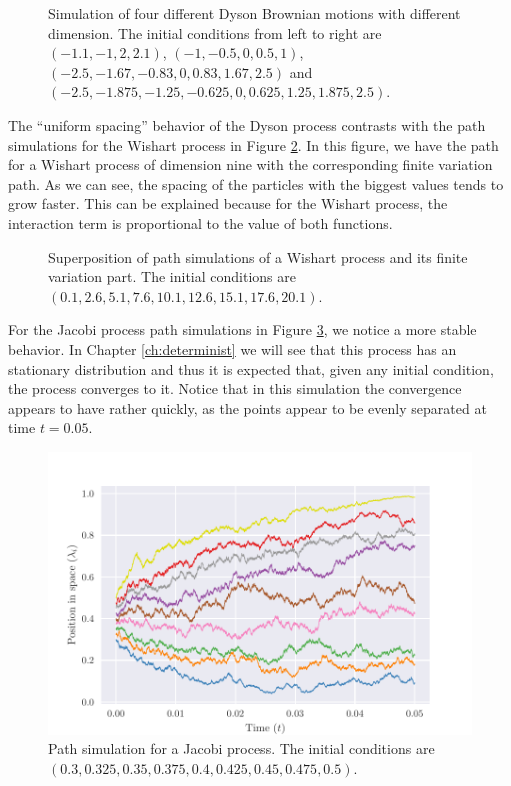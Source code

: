 \begin{figure}[h!] 
    
    \caption{Simulation of four different Dyson Brownian motions with different dimension. The initial conditions from left to right are $(-1.1,-1,2,2.1)$, $(-1, -0.5, 0, 0.5, 1)$, $(-2.5,-1.67,-0.83,0,0.83,1.67,2.5)$ and $(-2.5,-1.875,-1.25,-0.625,0,0.625,1.25,1.875,2.5)$.\label{fig:four_dyson}}
\end{figure}

The ``uniform spacing'' behavior of the Dyson process contrasts with the path simulations for the Wishart process in Figure \ref{fig:wishart_comparison}. In this figure, we have the path for a Wishart process of dimension nine with the corresponding finite variation path. As we can see, the spacing of the particles with the biggest values tends to grow faster. This can be explained because for the Wishart process, the interaction term is proportional to the value of both functions.

\begin{figure} 
    
    \caption{Superposition of path simulations of a Wishart process and its finite variation part. The initial conditions are $(0.1,2.6,5.1,7.6,10.1,12.6,15.1,17.6,20.1)$.\label{fig:wishart_comparison}}
\end{figure}

For the Jacobi process path simulations in Figure \ref{fig:jacobi}, we notice a more stable behavior. In Chapter \ref{ch:determinist} we will see that this process has an stationary distribution and thus it is expected that, given any initial condition, the process converges to it. Notice that in this simulation the convergence appears to have rather quickly, as the points appear to be evenly separated at time $t=0.05$.

\begin{figure} 
    \includegraphics[width=6in]{img/jacobi.pdf}
    \caption{Path simulation for a Jacobi process. The initial conditions are $(0.3,0.325,0.35,0.375,0.4,0.425,0.45,0.475,0.5)$.\label{fig:jacobi}}
\end{figure}



